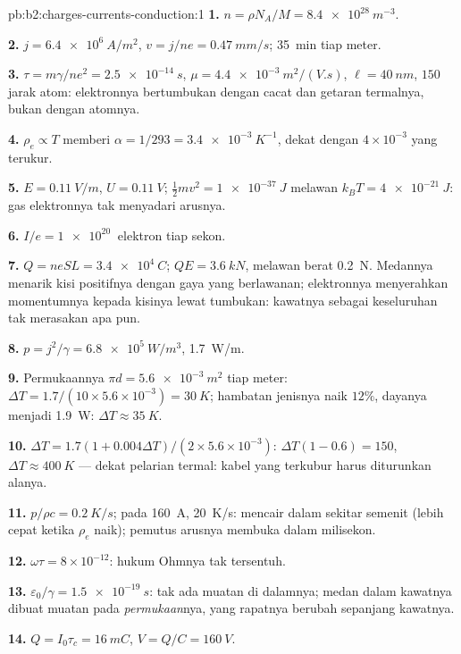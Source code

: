 \begin{solution}{pb:b2:charges-currents-conduction:1}
\textbf{1.} $n = \rho N_A/M = \qty{8.4e28}{m^{-3}}$.

\textbf{2.} $j = \qty{6.4e6}{A/m^2}$, $v = j/ne = \qty{0.47}{mm/s}$; \qty{35}{min} tiap meter.

\textbf{3.} $\tau = m\gamma/ne^2 = \qty{2.5e-14}{s}$, $\mu = \qty{4.4e-3}{m^2/(V.s)}$, $\ell =
\qty{40}{nm}$, $150$ jarak atom: elektronnya bertumbukan dengan cacat dan
getaran termalnya, bukan dengan atomnya.

\textbf{4.} $\rho_e \propto T$ memberi $\alpha = 1/293 = \qty{3.4e-3}{K^{-1}}$, dekat dengan
$4 \times 10^{-3}$ yang terukur.

\textbf{5.} $E = \qty{0.11}{V/m}$, $U = \qty{0.11}{V}$; $\tfrac12mv^2 = \qty{1e-37}{J}$ melawan
$k_BT = \qty{4e-21}{J}$: gas elektronnya tak menyadari arusnya.

\textbf{6.} $I/e = \qty{1e20}{}$ elektron tiap sekon.

\textbf{7.} $Q = neSL = \qty{3.4e4}{C}$; $QE = \qty{3.6}{kN}$, melawan berat
\qty{0.2}{N}. Medannya menarik kisi positifnya dengan gaya yang
berlawanan; elektronnya menyerahkan momentumnya kepada kisinya lewat tumbukan:
kawatnya sebagai keseluruhan tak merasakan apa pun.

\textbf{8.} $p = j^2/\gamma = \qty{6.8e5}{W/m^3}$, \qty{1.7}{W/m}.

\textbf{9.} Permukaannya $\pi d = \qty{5.6e-3}{m^2}$ tiap meter: $\Delta T = 1.7/(10 \times 5.6 \times
10^{-3}) = \qty{30}{K}$; hambatan jenisnya naik $12\%$, dayanya menjadi \qty{1.9}{W}:
$\Delta T \approx \qty{35}{K}$.

\textbf{10.} $\Delta T = 1.7(1 + 0.004\Delta T)/(2 \times 5.6 \times 10^{-3})$: $\Delta T(1 - 0.6) = 150$,
$\Delta T \approx \qty{400}{K}$ --- dekat pelarian termal: kabel yang terkubur harus
diturunkan alanya.

\textbf{11.} $p/\rho c = \qty{0.2}{K/s}$; pada \qty{160}{A}, \qty{20}{K/s}: mencair dalam
sekitar semenit (lebih cepat ketika $\rho_e$ naik); pemutus arusnya membuka dalam milisekon.

\textbf{12.} $\omega\tau = 8 \times 10^{-12}$: hukum Ohmnya tak tersentuh.

\textbf{13.} $\varepsilon_0/\gamma = \qty{1.5e-19}{s}$: tak ada muatan di dalamnya; medan dalam
kawatnya dibuat muatan pada \emph{permukaan}nya, yang rapatnya berubah
sepanjang kawatnya.

\textbf{14.} $Q = I_0\tau_c = \qty{16}{mC}$, $V = Q/C = \qty{160}{V}$.


\end{solution}
